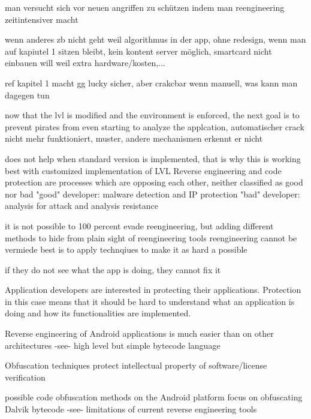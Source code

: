 man versucht sich vor neuen angriffen zu schützen indem man reengineering zeitintensiver macht


wenn anderes zb nicht geht weil algorithmus in der app, ohne redesign, wenn man auf kapiutel 1 sitzen bleibt, kein kontent server möglich, smartcard nicht einbauen will weil extra hardware/kosten,...

ref kapitel 1 macht gg lucky sicher, aber crakcbar wenn manuell, was kann man dagegen tun



now that the lvl is modified and the environment is enforced, the next goal is to prevent pirates from even starting to analyze the applcation, automatischer crack nicht mehr funktioniert, muster, andere mechanismen erkennt er nicht

does not help when standard version is implemented, that is why this is working best with customized implementation of LVL
%
Reverse engineering and code protection are processes which are opposing each other, neither classified as good nor bad\newline
"good" developer: malware detection and IP protection\newline
"bad" developer: analysis for attack and analysis resistance

\cite{kovachevaMaster}
%
it is not possible to 100 percent evade reengineering, but adding different methods to hide from plain sight of reengineering tools
%
reengineering cannot be vermiede
best is to apply technqiues to make it as hard a possible
\cite{munteanLicense}
%

if they do not see what the app is doing, they cannot fix it

Application developers are interested in protecting their applications. Protection in this case means that it should be hard to understand
what an application is doing and how its functionalities are implemented.\newline


Reverse engineering of Android applications is much easier than on other architectures -see- high level but simple bytecode language\newline

Obfuscation techniques protect intellectual property of software/license verification\newline

possible code obfuscation methods on the Android platform focus on obfuscating Dalvik bytecode -see- limitations of current reverse engineering tools\newline


